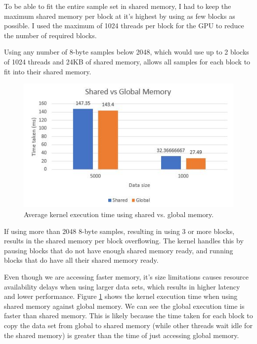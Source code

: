 \documentclass[11pt,a4paper]{article}
\begin{document}
To be able to fit the entire sample set in shared memory, I had to keep the maximum shared memory per block at it's highest by using as few blocks as possible. I used the maximum of 1024 threads per block for the GPU to reduce the number of required blocks.

Using any number of 8-byte samples below 2048, which would use up to 2 blocks of 1024 threads and 24KB of shared memory, allows all samples for each block to fit into their shared memory. 

\begin{figure}
\begin{center}
\includegraphics[scale=0.6]{shared_vs_global_graph}
\end{center}
\caption{Average kernel execution time using shared vs. global memory.}
\label{fig:shared_vs_global_graph}
\end{figure}

If using more than 2048 8-byte samples, resulting in using 3 or more blocks, results in the shared memory per block overflowing. The kernel handles this by pausing blocks that do not have enough shared memory ready, and running blocks that do have all their shared memory ready.

Even though we are accessing faster memory, it's size limitations causes resource availability delays when using larger data sets, which results in higher latency and lower performance. Figure \ref{fig:shared_vs_global_graph} shows the kernel execution time when using shared memory against global memory. We can see the global execution time is faster than shared memory. This is likely because the time taken for each block to copy the data set from global to shared memory (while other threads wait idle for the shared memory) is greater than the time of just accessing global memory.
\end{document}
